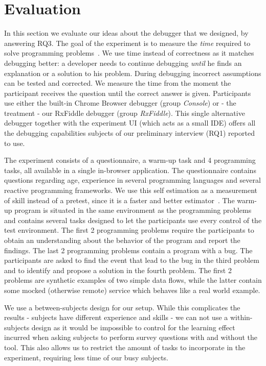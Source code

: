 \section{Evaluation}
\label{section-evaluation}

In this section we evaluate our ideas about the debugger that we designed, by answering RQ3. 
The goal of the experiment is to measure the \textit{time} required to solve programming problems~\cite{ko2015practical}. We use time instead of correctness as it matches debugging better: a developer needs to continue debugging \textit{until} he finds an explanation or a solution to his problem. During debugging incorrect assumptions can be tested and corrected. We measure the time from the moment the participant receives the question until the correct answer is given. Participants use either the built-in Chrome Browser debugger (group \emph{Console}) or - the treatment - our RxFiddle debugger (group \emph{RxFiddle}). This single alternative debugger together with the experiment UI (which acts as a small IDE) offers all the debugging capabilities subjects of our preliminary interview (RQ1) reported to use.

The experiment consists of a questionnaire, a warm-up task and 4 programming tasks, all available in a single in-browser application. The questionnaire contains questions regarding age, experience in several programming languages and several reactive programming frameworks. We use this self estimation as a measurement of skill instead of a pretest, since it is a faster and better estimator~\cite{kleinschmager2011rate,feigenspan2012measuring,siegmund2014measuring}. The warm-up program is situated in the same environment as the programming problems and contains several tasks designed to let the participants use every control of the test environment. The first 2 programming problems require the participants to obtain an understanding about the behavior of the program and report the findings. The last 2 programming problems contain a program with a bug. The participants are asked to find the event that lead to the bug in the third problem and to identify and propose a solution in the fourth problem. The first 2 problems are synthetic examples of two simple data flows, while the latter contain some mocked (otherwise remote) service which behaves like a real world example.

We use a between-subjects design for our setup. While this complicates the results - subjects have different experience and skills - we can not use a within-subjects design as it would be impossible to control for the learning effect incurred when asking subjects to perform survey questions with and without the tool. This also allows us to restrict the amount of tasks to incorporate in the experiment, requiring less time of our busy subjects.

